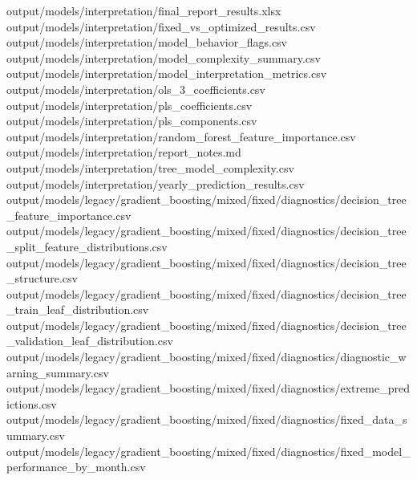 \documentclass[
  11pt,
  a4paper]{article}
\newenvironment{Shaded}{}{}
\newcommand{\NormalTok}[1]{#1}
\begin{document}
\begin{Shaded}
\begin{Highlighting}[]
\NormalTok{output/models/interpretation/final\_\allowbreak{}report\_\allowbreak{}results.xlsx}
\NormalTok{output/models/interpretation/fixed\_\allowbreak{}vs\_\allowbreak{}optimized\_\allowbreak{}results.csv}
\NormalTok{output/models/interpretation/model\_\allowbreak{}behavior\_\allowbreak{}flags.csv}
\NormalTok{output/models/interpretation/model\_\allowbreak{}complexity\_\allowbreak{}summary.csv}
\NormalTok{output/models/interpretation/model\_\allowbreak{}interpretation\_\allowbreak{}metrics.csv}
\NormalTok{output/models/interpretation/ols\_\allowbreak{}3\_\allowbreak{}coefficients.csv}
\NormalTok{output/models/interpretation/pls\_\allowbreak{}coefficients.csv}
\NormalTok{output/models/interpretation/pls\_\allowbreak{}components.csv}
\NormalTok{output/models/interpretation/random\_\allowbreak{}forest\_\allowbreak{}feature\_\allowbreak{}importance.csv}
\NormalTok{output/models/interpretation/report\_\allowbreak{}notes.md}
\NormalTok{output/models/interpretation/tree\_\allowbreak{}model\_\allowbreak{}complexity.csv}
\NormalTok{output/models/interpretation/yearly\_\allowbreak{}prediction\_\allowbreak{}results.csv}
\NormalTok{output/models/legacy/gradient\_\allowbreak{}boosting/mixed/fixed/diagnostics/decision\_\allowbreak{}tree\_\allowbreak{}feature\_\allowbreak{}importance.csv}
\NormalTok{output/models/legacy/gradient\_\allowbreak{}boosting/mixed/fixed/diagnostics/decision\_\allowbreak{}tree\_\allowbreak{}split\_\allowbreak{}feature\_\allowbreak{}distributions.csv}
\NormalTok{output/models/legacy/gradient\_\allowbreak{}boosting/mixed/fixed/diagnostics/decision\_\allowbreak{}tree\_\allowbreak{}structure.csv}
\NormalTok{output/models/legacy/gradient\_\allowbreak{}boosting/mixed/fixed/diagnostics/decision\_\allowbreak{}tree\_\allowbreak{}train\_\allowbreak{}leaf\_\allowbreak{}distribution.csv}
\NormalTok{output/models/legacy/gradient\_\allowbreak{}boosting/mixed/fixed/diagnostics/decision\_\allowbreak{}tree\_\allowbreak{}validation\_\allowbreak{}leaf\_\allowbreak{}distribution.csv}
\NormalTok{output/models/legacy/gradient\_\allowbreak{}boosting/mixed/fixed/diagnostics/diagnostic\_\allowbreak{}warning\_\allowbreak{}summary.csv}
\NormalTok{output/models/legacy/gradient\_\allowbreak{}boosting/mixed/fixed/diagnostics/extreme\_\allowbreak{}predictions.csv}
\NormalTok{output/models/legacy/gradient\_\allowbreak{}boosting/mixed/fixed/diagnostics/fixed\_\allowbreak{}data\_\allowbreak{}summary.csv}
\NormalTok{output/models/legacy/gradient\_\allowbreak{}boosting/mixed/fixed/diagnostics/fixed\_\allowbreak{}model\_\allowbreak{}performance\_\allowbreak{}by\_\allowbreak{}month.csv}

\end{Highlighting}
\end{Shaded}
\end{document}
